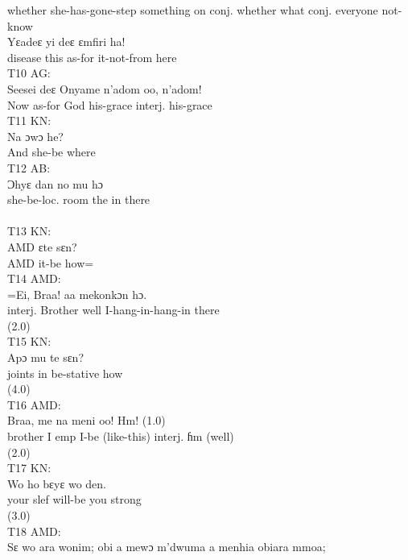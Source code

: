 \documentclass[output=paper,colorlinks,citecolor=brown]{langscibook}
\begin{document}
            whether she-has-gone-step something on conj. whether what conj. everyone not-know\\
    \ex
    \gll    Yɛadeɛ yi deɛ ɛmfiri ha! \\
            disease this as-for it-not-from here \\
    \z
\ex%
    T10 AG:\\
    \gll    Seesei deɛ Onyame n’adom oo, n’adom! \\
            Now as-for God his-grace interj. his-grace\\
\ex%
    T11 KN:\\
    \gll    Na ɔwɔ he?\\
            And she-be where\\
\ex%
    T12 AB:\\
    \gll    Ɔhyɛ dan no mu hɔ \\
            she-be-loc. room the in there\\
            [KN Enters AMD’s Room]\\
\ex%
    T13 KN:\\
    \gll    AMD ɛte sɛn?\\
            AMD it-be how=\\
\ex%
    T14 AMD:\\
    \gll    =Ei, Braa! aa mekonkɔn hɔ.\\
            interj. Brother well I-hang-in-hang-in there \\
            (2.0)\\
\ex%
    T15 KN:\\
    \gll    Apɔ mu te sɛn? \\
            joints in be-stative how\\
            (4.0)\\
\ex%
    T16 AMD:\\
    \gll    Braa, me na meni oo! Hm! (1.0)\\
            brother I emp I-be (like-this) interj. ɦm (well)\\
            (2.0)\\
\ex%
    T17 KN:\\
    \gll    Wo ho bɛyɛ wo den.\\
            your slef will-be you strong\\
            (3.0)\\
\ex%
    T18 AMD:\\
    \ea
    \gll    Sɛ wo ara wonim; obi a mewɔ m’dwuma a menhia obiara mmoa; \\
\end{document}
